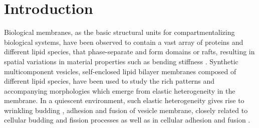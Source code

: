\documentclass[twoside,twocolumn,9pt]{article}
\begin{document}
\renewcommand*\rmdefault{bch}\normalfont\upshape
\rmfamily
\section*{}
\vspace{-1cm}








\section{\label{sec:Introduction}Introduction}
Biological membranes, as the basic structural units for compartmentalizing biological systems, 
have been observed to contain a vast array of proteins and different lipid species, that phase-separate and form domains or rafts, resulting in spatial variations in material properties such as bending stiffness \cite{}. Synthetic multicomponent vesicles, self-enclosed lipid bilayer membranes composed of different lipid species, have been used to study the rich patterns and accompanying morphologies which emerge from elastic heterogeneity in the membrane.  In a quiescent environment,  such elastic heterogeneity gives rise to wrinkling budding \cite{Lowengrub2009_PRE,Li2012_CommMathSci}, adhesion and fusion \cite{Zhao2011_PRE} of vesicle membrane, closely related to cellular budding and fission processes \cite{Rauch2000_BriophysJ} as well as in cellular adhesion and fusion \cite{Takeda2003_PNAS}. 
\end{document}
